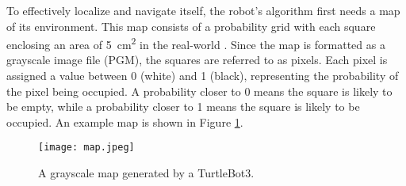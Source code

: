To effectively localize and navigate itself, the robot's algorithm first needs a map of its environment. This map consists of a probability grid with each square enclosing an area of \qty{5}{cm^2} in the real-world \parencite{hessRealtimeLoopClosure2016}. Since the map is formatted as a grayscale image file (PGM), the squares are referred to as pixels. Each pixel is assigned a value between 0 (white) and 1 (black), representing the probability of the pixel being occupied. A probability closer to 0 means the square is likely to be empty, while a probability closer to 1 means the square is likely to be occupied. An example map is shown in Figure \ref{fig:map}.

\begin{figure}[htb]
    \texttt{[image: map.jpeg]}
    \centering
    \caption{A grayscale map generated by a TurtleBot3.}
    \label{fig:map}
\end{figure}

